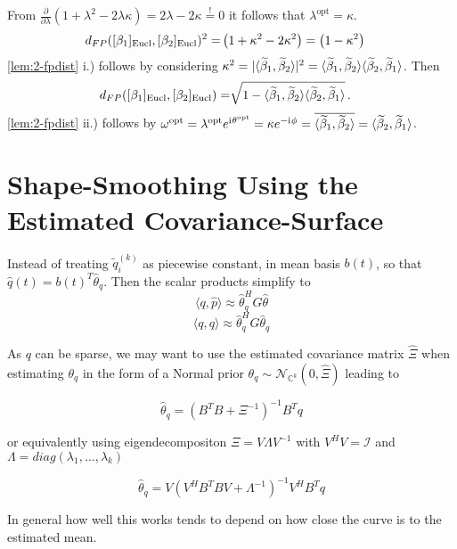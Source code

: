 From $\frac{\partial}{\partial\lambda}\left( 1 + \lambda^2 - 2\lambda\kappa \right) = 2\lambda - 2\kappa \overset{!}{=} 0$ it follows that $\lambda^\mathrm{opt} = \kappa$.
\begin{align*}
  d_{FP}([\beta_1]_{\mathrm{Eucl}},[\beta_2]_{\mathrm{Eucl}})^2 
   = &  \left( 1 + \kappa^2  - 2 \kappa^2 \right) =  \left( 1 - \kappa^2 \right)
\end{align*}
\cref{lem:2-fpdist} i.) follows by considering $\kappa^2 = \lvert\langle \widetilde \beta_1, \widetilde \beta_2 \rangle\rvert^2 = \langle \widetilde \beta_1, \widetilde \beta_2 \rangle \langle \widetilde \beta_2, \widetilde \beta_1 \rangle$.
Then
\begin{align*}
  d_{FP}([\beta_1]_{\mathrm{Eucl}},[\beta_2]_{\mathrm{Eucl}})
   = &  \sqrt{ 1 - \langle \widetilde \beta_1, \widetilde \beta_2 \rangle \langle \widetilde \beta_2, \widetilde \beta_1 \rangle }\,.
\end{align*}
\cref{lem:2-fpdist} ii.) follows by $\omega^\mathrm{opt} = \lambda^\mathrm{opt} e^{\mathrm{i}\mkern1mu \theta^\mathrm{opt}} = \kappa e^{-\mathrm{i}\mkern1mu\phi} = \overline{\langle \widetilde \beta_1, \widetilde \beta_2 \rangle} = \langle \widetilde \beta_2, \widetilde \beta_1 \rangle$.


\section{Shape-Smoothing Using the Estimated Covariance-Surface}
\label{app:a-smooth}
Instead of treating $\widetilde q_i^{(k)}$ as piecewise constant,  in mean basis $b(t)$, so that $\hat{q}(t) = b(t)^T \hat{\theta}_q$. Then the scalar products simplify to
$$ \langle q, \hat{p} \rangle \approx \hat{\theta}_q^H G \hat{\theta} $$
$$ \langle q, q \rangle \approx \hat{\theta}_q^H G \hat{\theta}_q $$

As $q$ can be sparse, we may want to use the estimated covariance matrix $\hat{\Xi}$ when estimating $\theta_q$ in the form of a Normal prior $\theta_q \sim \mathcal{N}_{\mathbb{C}^k}(0, \hat\Xi)$ leading to

$$ \hat\theta_q = (B^T B + \Xi^{-1})^{-1} B^T q $$

or equivalently using eigendecompositon $\Xi = V \Lambda V^{-1}$ with $V^H V = \mathcal{I}$ and $\Lambda = diag(\lambda_1, \dots, \lambda_k)$

$$ \hat\theta_q = V ( V^H B^T B V + \Lambda^{-1})^{-1} V^H B^T q$$

In general how well this works tends to depend on how close the curve is to the estimated mean.

